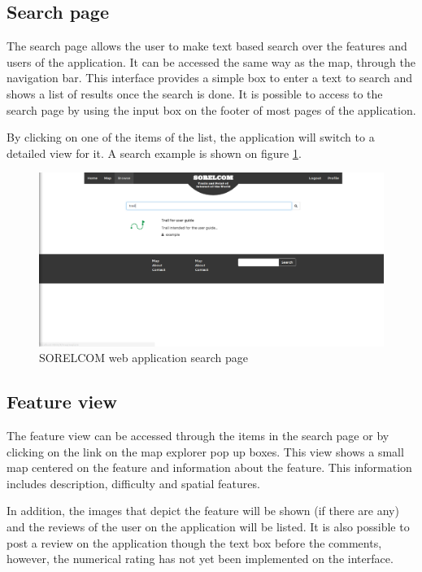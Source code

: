 \subsection{Search page}

The search page allows the user to make text based search over the features and users of the application. It can be accessed the same way as the map, through the navigation bar. This interface provides a simple box to enter a text to search and shows a list of results once the search is done. It is possible to access to the search page by using the input box on the footer of most pages of the application.

By clicking on one of the items of the list, the application will switch to a detailed view for it. A search example is shown on figure \ref{fig:search}.

\begin{figure}[ht]
  \centering
  \includegraphics[width=.75\textwidth]{fig/search}
  \caption{SORELCOM web application search page}
  \label{fig:search}
\end{figure}

\subsection{Feature view}

The feature view can be accessed through the items in the search page or by clicking on the link on the map explorer pop up boxes. This view shows a small map centered on the feature and information about the feature. This information includes description, difficulty and spatial features.

In addition, the images that depict the feature will be shown (if there are any) and the reviews of the user on the application will be listed. It is also possible to post a review on the application though the text box before the comments, however, the numerical rating has not yet been implemented on the interface.

